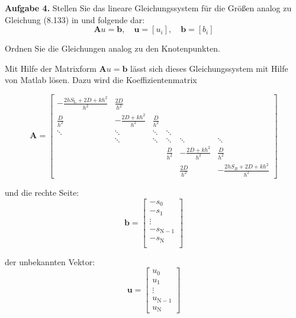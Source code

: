 \begin{mybox}
	\textbf{Aufgabe 4.} Stellen Sie das lineare Gleichungssystem für die Größen analog zu Gleichung (8.133) in \cite{Atkinson.2004} und folgende dar:
	\begin{equation*}
		\mathbf{A} u = \mathbf{b},\quad \mathbf{u} = [u_i],\quad \mathbf{b} = [b_i]
	\end{equation*}

	Ordnen Sie die Gleichungen analog zu den Knotenpunkten.
\end{mybox}




Mit Hilfe der Matrixform $\mathbf{A} u =\mathbf{ b} $ lässt sich dieses Gleichungssystem mit Hilfe von Matlab lösen. Dazu wird die Koeffizientenmatrix

\begin{equation}
\mathbf{A}=	\begin{bmatrix}
		-\frac{2hS_\mathrm{L}+2D+kh^2}{h^2} & \frac{2D}{h^2} & & &  &   \\
		\frac{D}{h^2} & - \frac{2D+kh^2}{h^2} & \frac{D}{h^2} &  &  & \\
	\ddots	&  \ddots &  \ddots &  \ddots &  &  \\
		& \ddots & \ddots & \ddots & \ddots  & \ddots \\
		&  &  & \frac{D}{h^2} & - \frac{2D+kh^2}{h^2} & \frac{D}{h^2} \\
		&  &  &  & \frac{2D}{h^2} & -\frac{2hS_R+2D+kh^2}{h^2}
	\end{bmatrix}
\end{equation}
 




und die rechte Seite:
\begin{equation}
	\mathbf{b}=\begin{bmatrix}
	-	s_0 \\
	-	s_1 \\
		\vdots \\
	-	s_{\mathrm{N}-1} \\
	-	s_{\mathrm{N}} \\
	\end{bmatrix}
\end{equation}

der unbekannten Vektor:
\begin{equation}
	\mathbf{u}=\begin{bmatrix}
		u_0 \\
		u_1 \\
		\vdots \\
		u_{\mathrm{N}-1} \\
		u_\mathrm{N}
	\end{bmatrix}
\end{equation}

